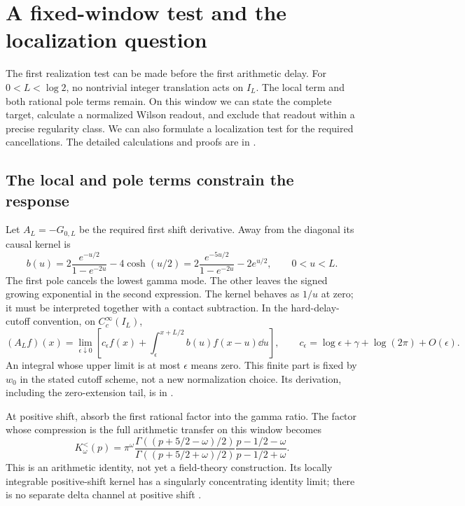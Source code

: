 \section{A fixed-window test and the localization question}
\label{sec:fixed-window}

The first realization test can be made before the first arithmetic
delay. For $0<L<\log2$, no nontrivial integer translation acts on
$I_L$. The local term and both rational pole terms remain. On this
window we can state the complete target, calculate a normalized
Wilson readout, and exclude that readout within a precise regularity
class. We can also formulate a localization test for the required
cancellations. The detailed calculations and proofs are in
\cite[Sections~S10--S12]{Supplement}.

\subsection{The local and pole terms constrain the response}

Let $A_L=-G_{0,L}$ be the required first shift derivative. Away
from the diagonal its causal kernel is
\begin{equation}\label{eq:main-required-response}
 b(u)=2\frac{e^{-u/2}}{1-e^{-2u}}-4\cosh(u/2)
     =2\frac{e^{-5u/2}}{1-e^{-2u}}-2e^{u/2},
 \qquad 0<u<L.
\end{equation}
The first pole cancels the lowest gamma mode. The other leaves
the signed growing exponential in the second expression.
The kernel behaves as $1/u$ at zero; it must be interpreted
together with a contact subtraction. In the hard-delay-cutoff
convention, on $C_c^\infty(I_L)$,
\begin{equation}\label{eq:main-contact}
 (A_Lf)(x)=\lim_{\epsilon\downarrow0}
 \left[c_\epsilon f(x)+
 \int_\epsilon^{x+L/2}b(u)f(x-u)\dd u\right],
 \qquad
 c_\epsilon=\log\epsilon+\gamma+\log(2\pi)+O(\epsilon).
\end{equation}
An integral whose upper limit is at most $\epsilon$ means zero.
This finite part is fixed by $w_0$ in the stated cutoff scheme,
not a new normalization choice. Its derivation, including the
zero-extension tail, is in \cite[Section~S10.1]{Supplement}.

At positive shift, absorb the first rational factor into the
gamma ratio. The factor whose compression is the full arithmetic
transfer on this window becomes
\begin{equation}\label{eq:main-small-factor}
 K_\omega^{<}(p)=
 \pi^\omega
 \frac{\Gamma((p+5/2-\omega)/2)}
      {\Gamma((p+5/2+\omega)/2)}
 \frac{p-1/2-\omega}{p-1/2+\omega}.
\end{equation}
This is an arithmetic identity, not yet a field-theory
construction. Its locally integrable positive-shift kernel has
a singularly concentrating identity limit; there is no separate
delta channel at positive shift
\cite[Section~S10.2]{Supplement}.

